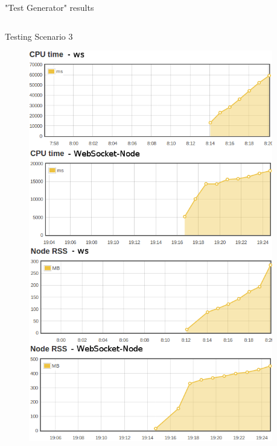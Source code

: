 \documentclass{soa.cs.pub.ro}
\begin{document}
\begin{frame}{"Test Generator" results}
  \begin{columns}
    \begin{column}[l]{0.45\textwidth}
      \begin{center}
        Testing Scenario 3
      \end{center}
      \begin{figure}
         \includegraphics[scale=0.18]{img/test3v2.png}
      \end{figure}
    \end{column}
    \begin{column}[l]{0.45\textwidth}
      \begin{center}

\end{center}
\end{column}
\end{columns}
\end{frame}
\end{document}
